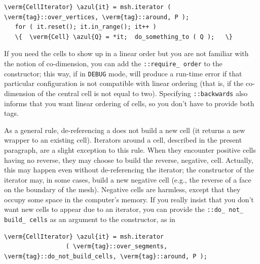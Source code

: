 \begin{Verbatim}[commandchars=\\\{\},formatcom=\small\tt,
   baselinestretch=0.94,framesep=2mm                      ]
   \verm{CellIterator} \azul{it} = msh.iterator ( \verm{tag}::over_vertices, \verm{tag}::around, P );
   for ( it.reset(); it.in_range(); it++ )
   \{  \verm{Cell} \azul{Q} = *it;  do_something_to ( Q );   \}
\end{Verbatim}

If you need the cells to show up in a linear order but you are not familiar
with the notion of co-dimension, you can add the {\small\tt{}::require\_\,order}
to the {\small\tt{}} constructor;
this way, if in {\small\tt DEBUG} mode, {\maniFEM} will produce a run-time error
if that particular configuration is not compatible with linear ordering
(that is, if the co-dimension of the central cell is not equal to two).
Specifying {\small\tt{}::backwards} also informs {\maniFEM} that you want
linear ordering of cells, so you don't have to provide both tags.

As a general rule, de-referencing a {\small\tt{}} does not build a new
cell (it returns a new wrapper to an existing cell).
Iterators around a cell, described in the present paragraph, are a slight exception to this
rule.
When they encounter positive cells having no reverse, they may choose to build the reverse,
negative, cell.
Actually, this may happen even without de-referencing the iterator;
the constructor of the iterator may, in some cases, build a new negative cell
(e.g., the reverse of a face on the boundary of the mesh).
Negative cells are harmless, except that they occupy some space in the computer's memory.
If you really insist that you don't want new cells to appear due to an iterator,
you can provide the {\small\tt{}::do\_\,not\_\,build\_\,cells} as an argument
to the constructor, as in

\begin{Verbatim}[commandchars=\\\{\},formatcom=\small\tt,
   baselinestretch=0.94,framesep=2mm                      ]
   \verm{CellIterator} \azul{it} = msh.iterator
                 ( \verm{tag}::over_segments, \verm{tag}::do_not_build_cells, \verm{tag}::around, P );
\end{Verbatim}


\section{~~\cinza{[empty]}}\label{\numb section 9.\numb parag 9}


